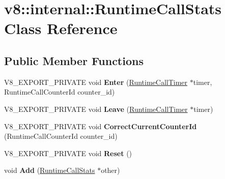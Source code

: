 \hypertarget{classv8_1_1internal_1_1RuntimeCallStats}{}\section{v8\+:\+:internal\+:\+:Runtime\+Call\+Stats Class Reference}
\label{classv8_1_1internal_1_1RuntimeCallStats}
\subsection*{Public Member Functions}
\begin{DoxyCompactItemize}
\item 
\mbox{\label{classv8_1_1internal_1_1RuntimeCallStats_ac16f2dc48e07cb66fa88e473fe3e2472}} 
V8\+\_\+\+E\+X\+P\+O\+R\+T\+\_\+\+P\+R\+I\+V\+A\+TE void {\bfseries Enter} (\mbox{\hyperlink{classv8_1_1internal_1_1RuntimeCallTimer}{Runtime\+Call\+Timer}} $\ast$timer, Runtime\+Call\+Counter\+Id counter\+\_\+id)
\item 
\mbox{\label{classv8_1_1internal_1_1RuntimeCallStats_a5d5eeba49d474e5f679f0890dec5f4f9}} 
V8\+\_\+\+E\+X\+P\+O\+R\+T\+\_\+\+P\+R\+I\+V\+A\+TE void {\bfseries Leave} (\mbox{\hyperlink{classv8_1_1internal_1_1RuntimeCallTimer}{Runtime\+Call\+Timer}} $\ast$timer)
\item 
\mbox{\label{classv8_1_1internal_1_1RuntimeCallStats_a3cd048de490b53acd9c602532b555d5d}} 
V8\+\_\+\+E\+X\+P\+O\+R\+T\+\_\+\+P\+R\+I\+V\+A\+TE void {\bfseries Correct\+Current\+Counter\+Id} (Runtime\+Call\+Counter\+Id counter\+\_\+id)
\item 
\mbox{\label{classv8_1_1internal_1_1RuntimeCallStats_ab058d39c32704ceb58055dbb3e81db58}} 
V8\+\_\+\+E\+X\+P\+O\+R\+T\+\_\+\+P\+R\+I\+V\+A\+TE void {\bfseries Reset} ()
\item 
\mbox{\label{classv8_1_1internal_1_1RuntimeCallStats_aef9856b5e2d6ef1b6bd62a1855cc852e}} 
void {\bfseries Add} (\mbox{\hyperlink{classv8_1_1internal_1_1RuntimeCallStats}{Runtime\+Call\+Stats}} $\ast$other)
\item 
\mbox{\label{classv8_1_1internal_1_1RuntimeCallStats_a0caa1985c73712d7e45190c4b2e5a0f4}} 

\end{DoxyCompactItemize}
